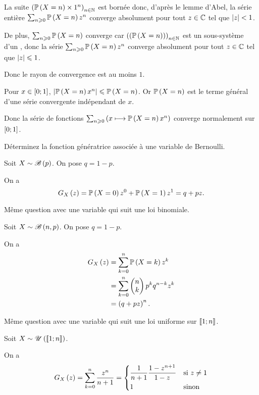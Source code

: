 \begin{dem}
La suite \(\paren{\proba{X=n}\times1^n}_{n\in\N}\) est bornée donc, d'après le lemme d'Abel, la série entière \(\sum_{n\geq0}\proba{X=n}z^n\) converge absolument pour tout \(z\in\C\) tel que \(\abs{z}<1\).

De plus, \(\sum_{n\geq0}\proba{X=n}\) converge car \(\paren{\paren{\proba{X=n}}}_{n\in\N}\) est un sous-système d'un \sce, donc la série \(\sum_{n\geq0}\proba{X=n}z^n\) converge absolument pour tout \(z\in\C\) tel que \(\abs{z}\leq1\).

Donc le rayon de convergence est au moins \(1\).

Pour \(x\in\intervii{0}{1}\), \(\abs{\proba{X=n}x^n}\leq\proba{X=n}\). Or \(\proba{X=n}\) est le terme général d'une série convergente indépendant de \(x\).

Donc la série de fonctions \(\sum_{n\geq0}\paren{x\mapsto\proba{X=n}x^n}\) converge normalement sur \(\intervii{0}{1}\).
\end{dem}

\begin{exo}
Déterminez la fonction génératrice associée à une variable de Bernoulli.
\end{exo}

\begin{corr}
Soit \(X\sim\loibernoulli{p}\). On pose \(q=1-p\).

On a \[G_X\paren{z}=\proba{X=0}z^0+\proba{X=1}z^1=q+pz.\]
\end{corr}

\begin{exo}
Même question avec une variable qui suit une loi binomiale.
\end{exo}

\begin{corr}
Soit \(X\sim\loibinomiale{n}{p}\). On pose \(q=1-p\).

On a \[\begin{aligned}
G_X\paren{z}&=\sum_{k=0}^n\proba{X=k}z^k \\
&=\sum_{k=0}^n\binom{k}{n}p^kq^{n-k}z^k \\
&=\paren{q+pz}^n.
\end{aligned}\]
\end{corr}

\begin{exo}
Même question avec une variable qui suit une loi uniforme sur \(\interventierii{1}{n}\).
\end{exo}

\begin{corr}
Soit \(X\sim\loiuniforme{\interventierii{1}{n}}\).

On a \[G_X\paren{z}=\sum_{k=0}^n\dfrac{z^n}{n+1}=\begin{dcases}
\dfrac{1}{n+1}\dfrac{1-z^{n+1}}{1-z} &\text{si }z\not=1 \\
1 &\text{sinon}
\end{dcases}\]
\end{corr}

